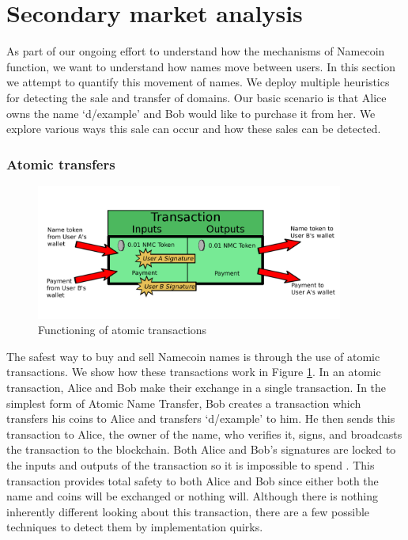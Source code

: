 \section{Secondary market analysis}
\label{sec:methods}
As part of our ongoing effort to understand how the mechanisms of Namecoin function, we want to understand how names move between users. In this section we attempt to quantify this movement of names. We deploy multiple heuristics for detecting the sale and transfer of domains. Our basic scenario is that Alice owns the name `d/example' and Bob would like to purchase it from her. We explore various ways this sale can occur and how these sales can be detected.

\subsubsection{Atomic transfers}

\begin{figure}
  \centering
  \includegraphics[width=0.9\textwidth]{figures/atomicTX}
  \caption{Functioning of atomic transactions}
  \label{fig:atomic}
\end{figure}

The safest way to buy and sell Namecoin names is through the use of atomic transactions. We show how these transactions work in Figure \ref{fig:atomic}. In an atomic transaction, Alice and Bob make their exchange in a single transaction. In the simplest form of Atomic Name Transfer, Bob creates a transaction which transfers his coins to Alice and transfers `d/example' to him. He then sends this transaction to Alice, the owner of the name, who verifies it, signs, and broadcasts the transaction to the blockchain. Both Alice and Bob's signatures are locked to the inputs and outputs of the transaction so it is impossible to spend . This transaction provides total safety to both Alice and Bob since either both the name and coins will be exchanged or nothing will. Although there is nothing inherently different looking about this transaction, there are a few possible techniques to detect them by implementation quirks.

